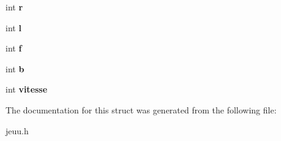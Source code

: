 \begin{DoxyCompactItemize}
\item 
int {\bfseries r}\hypertarget{structpersonnage_a25d9fb2b98dd6be4f4eefba8f2a38b82}{}\label{structpersonnage_a25d9fb2b98dd6be4f4eefba8f2a38b82}

\item 
int {\bfseries l}\hypertarget{structpersonnage_a7040732f9c398fb86de4c04ecc715025}{}\label{structpersonnage_a7040732f9c398fb86de4c04ecc715025}

\item 
int {\bfseries f}\hypertarget{structpersonnage_aea5131bcc7f6080288decc0558e126d8}{}\label{structpersonnage_aea5131bcc7f6080288decc0558e126d8}

\item 
int {\bfseries b}\hypertarget{structpersonnage_aa5e237ab4232924907390880186d2d97}{}\label{structpersonnage_aa5e237ab4232924907390880186d2d97}

\item 
int {\bfseries vitesse}\hypertarget{structpersonnage_ad87c7202fadb5ed485e21a7d2e46bbb0}{}\label{structpersonnage_ad87c7202fadb5ed485e21a7d2e46bbb0}

\end{DoxyCompactItemize}


The documentation for this struct was generated from the following file\+:\begin{DoxyCompactItemize}
\item 
jeuu.\+h\end{DoxyCompactItemize}
